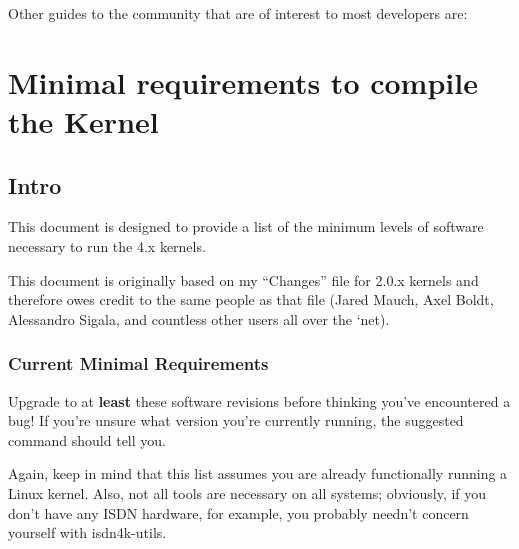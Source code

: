 \documentclass[a4paper,8pt,english]{sphinxmanual}
\begin{document}
Other guides to the community that are of interest to most developers are:


\chapter{Minimal requirements to compile the Kernel}
\label{process/changes:changes}\label{process/changes:minimal-requirements-to-compile-the-kernel}\label{process/changes::doc}

\section{Intro}
\label{process/changes:intro}
This document is designed to provide a list of the minimum levels of
software necessary to run the 4.x kernels.

This document is originally based on my ``Changes'' file for 2.0.x kernels
and therefore owes credit to the same people as that file (Jared Mauch,
Axel Boldt, Alessandro Sigala, and countless other users all over the
`net).


\subsection{Current Minimal Requirements}
\label{process/changes:current-minimal-requirements}
Upgrade to at \textbf{least} these software revisions before thinking you've
encountered a bug!  If you're unsure what version you're currently
running, the suggested command should tell you.

Again, keep in mind that this list assumes you are already functionally
running a Linux kernel.  Also, not all tools are necessary on all
systems; obviously, if you don't have any ISDN hardware, for example,
you probably needn't concern yourself with isdn4k-utils.
\end{document}
